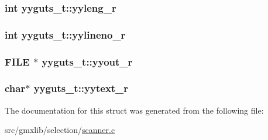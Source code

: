 \hypertarget{structyyguts__t_aba739bc731f0e9cbb0b6bdfca7930ebd}{
\subsubsection[{yyleng\-\_\-r}]{\setlength{\rightskip}{0pt plus 5cm}int {\bf yyguts\-\_\-t\-::yyleng\-\_\-r}}}\label{structyyguts__t_aba739bc731f0e9cbb0b6bdfca7930ebd}
\hypertarget{structyyguts__t_aa9f13776b8d311e847cc7d974d49af4c}{
\subsubsection[{yylineno\-\_\-r}]{\setlength{\rightskip}{0pt plus 5cm}int {\bf yyguts\-\_\-t\-::yylineno\-\_\-r}}}\label{structyyguts__t_aa9f13776b8d311e847cc7d974d49af4c}
\hypertarget{structyyguts__t_a436368a905aaf12e809e265749c74031}{
\subsubsection[{yyout\-\_\-r}]{\setlength{\rightskip}{0pt plus 5cm}\-F\-I\-L\-E $\ast$ {\bf yyguts\-\_\-t\-::yyout\-\_\-r}}}\label{structyyguts__t_a436368a905aaf12e809e265749c74031}
\hypertarget{structyyguts__t_aebaa731ad6cbe2411d104925e5bb3f2c}{
\subsubsection[{yytext\-\_\-r}]{\setlength{\rightskip}{0pt plus 5cm}char$\ast$ {\bf yyguts\-\_\-t\-::yytext\-\_\-r}}}\label{structyyguts__t_aebaa731ad6cbe2411d104925e5bb3f2c}


\-The documentation for this struct was generated from the following file\-:\begin{DoxyCompactItemize}
\item 
src/gmxlib/selection/\hyperlink{scanner_8c}{scanner.\-c}\end{DoxyCompactItemize}
